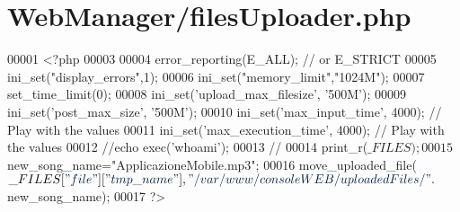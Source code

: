 \hypertarget{filesUploader_8php_source}{\section{\-Web\-Manager/files\-Uploader.php}
}

\begin{DoxyCode}
00001 <?php
00003 
00004 error\_reporting(E\_ALL); \textcolor{comment}{// or E\_STRICT}
00005 ini\_set(\textcolor{stringliteral}{"display\_errors"},1);
00006 ini\_set(\textcolor{stringliteral}{"memory\_limit"},\textcolor{stringliteral}{"1024M"});
00007 set\_time\_limit(0);
00008 ini\_set(\textcolor{stringliteral}{'upload\_max\_filesize'}, \textcolor{stringliteral}{'500M'});
00009 ini\_set(\textcolor{stringliteral}{'post\_max\_size'}, \textcolor{stringliteral}{'500M'});
00010 ini\_set(\textcolor{stringliteral}{'max\_input\_time'}, 4000); \textcolor{comment}{// Play with the values}
00011 ini\_set(\textcolor{stringliteral}{'max\_execution\_time'}, 4000); \textcolor{comment}{// Play with the values}
00012 \textcolor{comment}{//echo exec('whoami');}
00013 \textcolor{comment}{//}
00014 print\_r($\_FILES);
00015 $new\_song\_name=\textcolor{stringliteral}{"ApplicazioneMobile.mp3"};
00016 move\_uploaded\_file($\_FILES[\textcolor{stringliteral}{"file"}][\textcolor{stringliteral}{"tmp\_name"}], \textcolor{stringliteral}{"
      /var/www/consoleWEB/uploadedFiles/"}.$new\_song\_name);
00017 ?>
\end{DoxyCode}
